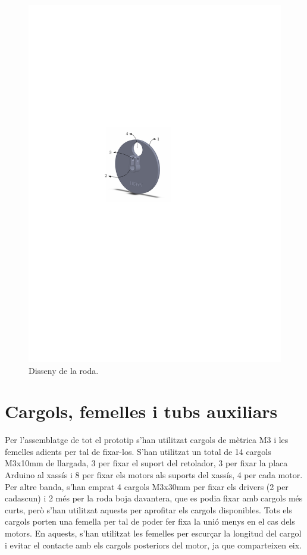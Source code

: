 \begin{figure}[H]
	\centering
	\includegraphics{roda}
	\caption{Disseny de la roda.}
	\label{fig:roda}
\end{figure}


\section{Cargols, femelles i tubs auxiliars}

Per l’assemblatge de tot el prototip s’han utilitzat cargols de mètrica M3 i les femelles adients per tal de fixar-los. S’han utilitzat un total de 14 cargols M3x10mm de llargada, 3 per fixar el suport del retolador, 3 per fixar la placa Arduino al xassís i 8 per fixar els motors als suports del xassís, 4 per cada motor. Per altre banda, s’han emprat 4 cargols M3x30mm per fixar els drivers (2 per cadascun) i 2 més per la roda boja davantera, que es podia fixar amb cargols més curts, però s’han utilitzat aquests per aprofitar els cargols disponibles. Tots els cargols porten una femella per tal de poder fer fixa la unió menys en el cas dels motors. En aquests, s'han utilitzat les femelles per escurçar la longitud del cargol i evitar el contacte amb els cargols posteriors del motor, ja que comparteixen eix. 

